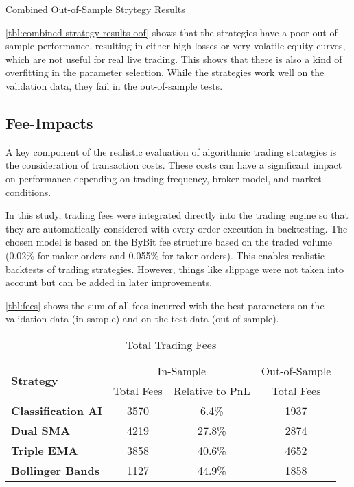 \begin{table}[H]
    
    \caption{Combined Out-of-Sample Strytegy Results}
    \label{tbl:combined-strategy-results-oof}
\end{table}


\noindent
\autoref{tbl:combined-strategy-results-oof} shows that the strategies have a poor out-of-sample performance, resulting in either high losses or very volatile equity curves, which are not useful for real live trading.
This shows that there is also a kind of overfitting in the parameter selection.
While the strategies work well on the validation data, they fail in the out-of-sample tests.

\subsection{Fee-Impacts}

A key component of the realistic evaluation of algorithmic trading strategies is the consideration of transaction costs.
These costs can have a significant impact on performance depending on trading frequency, broker model, and market conditions.

In this study, trading fees were integrated directly into the trading engine so that they are automatically considered with every order execution in backtesting.
The chosen model is based on the ByBit fee structure based on the traded volume (0.02\% for maker orders and 0.055\% for taker orders).
This enables realistic backtests of trading strategies.
However, things like slippage were not taken into account but can be added in later improvements.

\autoref{tbl:fees} shows the sum of all fees incurred with the best parameters on the validation data (in-sample) and on the test data (out-of-sample).

\begin{table}[H]
    \centering
    \centering
    \begin{tabular}{l|ccc}
        \toprule
        \multirow{2}{*}{\textbf{Strategy}} & \multicolumn{2}{c}{In-Sample} & Out-of-Sample \\
        & Total Fees & Relative to PnL & Total Fees \\
        \midrule
        \textbf{Classification AI} & 3570       & 6.4\%           & 1937       \\
        \textbf{Dual SMA}          & 4219       & 27.8\%          & 2874       \\
        \textbf{Triple EMA}        & 3858       & 40.6\%          & 4652       \\
        \textbf{Bollinger Bands}   & 1127       & 44.9\%          & 1858       \\
        \bottomrule
    \end{tabular}
    \label{tbl:fees}
    \caption{Total Trading Fees}
\end{table}

